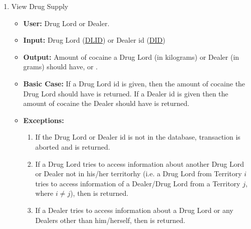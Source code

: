 \documentclass[11pt, oneside]{article}   	%
\theoremstyle{definition}
\theoremstyle{remark}
\begin{document}
\begin{enumerate}
	
	\item View Drug Supply
	\begin{itemize}
		\item \textbf{User:} Drug Lord or Dealer.
		\item \textbf{Input:} Drug Lord (\underline{DLID}) or Dealer id (\underline{DID})
		\item \textbf{Output:} Amount of cocaine a Drug Lord (in kilograms) or Dealer (in grams) should have,  or .
		\item \textbf{Basic Case:} If a Drug Lord id is given, then the amount of cocaine the Drug Lord should have is returned. If a Dealer id is given then the amount of cocaine the Dealer should have is returned.
		\item \textbf{Exceptions:}
		\begin{enumerate}
			\item If the Drug Lord or Dealer id is not in the database, transaction is aborted and  is returned.
			\item If a Drug Lord tries to access information about another Drug Lord or Dealer not in his/her territorhy (i.e. a Drug Lord from Territory $i$ tries to access information of a Dealer/Drug Lord from a Territory $j$, where $i\neq j$), then  is returned.	
			\item If a Dealer tries to access information about a Drug Lord or any Dealers other than him/herself, then  is returned.	
		\end{enumerate}
	\end{itemize}	
	

\end{enumerate}
\end{document}
